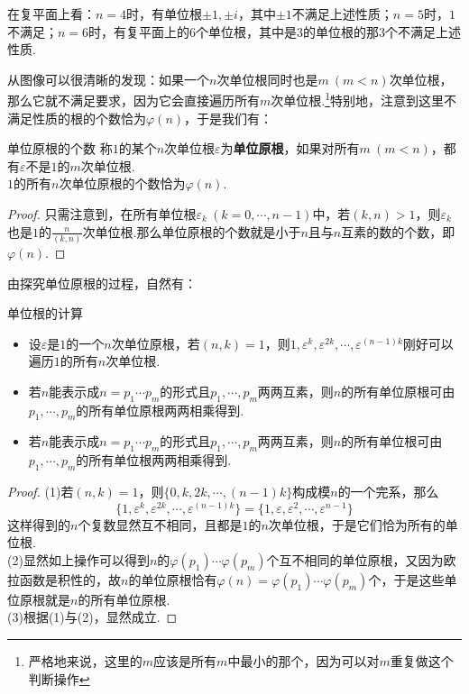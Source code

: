 \documentclass[lang=cn, zihao=5]{elegantbook}
\begin{document}
在复平面上看：$n=4$时，有单位根$\pm 1,\pm i$，其中$\pm 1$不满足上述性质；$n=5$时，$1$不满足；$n=6$时，有复平面上的$6$个单位根，其中是$3$的单位根的那$3$个不满足上述性质.


从图像可以很清晰的发现：如果一个$n$次单位根同时也是$m~(m<n)$次单位根，那么它就不满足要求，因为它会直接遍历所有$m$次单位根.\footnote{严格地来说，这里的$m$应该是所有$m$中最小的那个，因为可以对$m$重复做这个判断操作}特别地，注意到这里不满足性质的根的个数恰为$\varphi (n)$，于是我们有： 

\begin{theorem}{单位原根的个数}
	称$1$的某个$n$次单位根$\varepsilon$为\textbf{单位原根}，如果对所有$m~(m<n)$，都有$\varepsilon$不是$1$的$m$次单位根. \\
	$1$的所有$n$次单位原根的个数恰为$\varphi (n)$.
\end{theorem}
\begin{proof}
	只需注意到，在所有单位根$\varepsilon _k~(k=0,\cdots ,n-1)$中，若$(k,n)>1$，则$\varepsilon _k$也是$1$的$\frac{n}{(k,n)}$次单位根.那么单位原根的个数就是小于$n$且与$n$互素的数的个数，即$\varphi (n)$.
\end{proof}

由探究单位原根的过程，自然有：

\begin{theorem}{单位根的计算}
	\begin{itemize}
		\item 设$\varepsilon$是$1$的一个$n$次单位原根，若$(n,k)=1$，则$1,\varepsilon ^k,\varepsilon ^{2k},\cdots ,\varepsilon ^{(n-1)k}$刚好可以遍历$1$的所有$n$次单位根.
		\item 若$n$能表示成$n=p_1 \cdots p_m$的形式且$p_1, \cdots ,p_m$两两互素，则$n$的所有单位原根可由$p_1,\cdots ,p_m$的所有单位原根两两相乘得到.
		\item 若$n$能表示成$n=p_1 \cdots p_m$的形式且$p_1, \cdots ,p_m$两两互素，则$n$的所有单位根可由$p_1,\cdots ,p_m$的所有单位根两两相乘得到.
	\end{itemize}
\end{theorem}
\begin{proof}
	(1)若$(n,k)=1$，则$\{ 0,k,2k,\cdots ,(n-1)k \}$构成模$n$的一个完系，那么$$\{ 1,\varepsilon ^k,\varepsilon ^{2k},\cdots ,\varepsilon ^{(n-1)k} \} = \{ 1,\varepsilon ,\varepsilon ^2,\cdots ,\varepsilon ^{n-1}\}$$
	这样得到的$n$个复数显然互不相同，且都是$1$的$n$次单位根，于是它们恰为所有的单位根. \\
	(2)显然如上操作可以得到$n$的$\varphi (p_1) \cdots \varphi (p_m)$个互不相同的单位原根，又因为欧拉函数是积性的，故$n$的单位原根恰有$\varphi (n)=\varphi (p_1) \cdots \varphi (p_m)$个，于是这些单位原根就是$n$的所有单位原根. \\
	(3)根据(1)与(2)，显然成立.
\end{proof}
\end{document}
